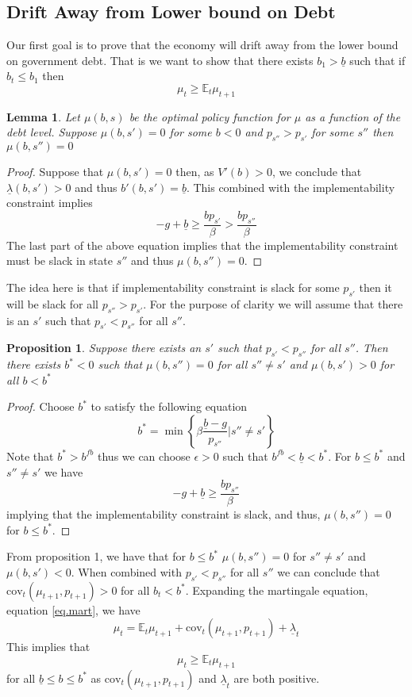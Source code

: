 \documentclass[12pt]{article}
\newcommand{\EE}{\mathbb E}
\newcommand{\cov}{\text{cov}}
\newtheorem{lemma}{Lemma}
\newtheorem{proposition}{Proposition}
\begin{document}
\subsection{Drift Away from Lower bound on Debt}
Our first goal is to prove that the economy will drift away from the lower bound on government debt.  That is we want to show that there exists $b_1 > \underline b$  such that if $b_t\leq b_1$ then 
\[
\mu_t \geq \EE_t \mu_{t+1}
\]
\begin{lemma}
Let $\mu(b,s)$ be the optimal policy function for $\mu$ as a function of the debt level.  Suppose $\mu(b,s') = 0$ for some $b < 0$ and $p_{s''}  > p_{s'}$ for some $s''$ then $\mu(b,s'') = 0$
\end{lemma}
\begin{proof}
Suppose that $\mu(b,s') = 0$ then, as $V'(b) > 0$, we conclude that $\underline \lambda(b,s') >0$ and thus $b'(b,s') = \underline b$.  This combined with the implementability constraint implies
\[
	-g +\underline b \geq \frac{b p_{s'}}{\beta} > \frac{b p_{s''}}{\beta}
\]The last part of the above equation implies that the implementability constraint must be slack in state $s''$ and thus $\mu(b,s'') = 0$.
\end{proof}  The idea here is that if implementability constraint is slack for some $p_{s'}$ then it will be slack for all $p_{s''} > p_{s'}$.  For the purpose of clarity we will assume that there is an $s'$ such that $p_{s'} < p_{s''}$ for all $s''$.
\begin{proposition}  Suppose there exists an $s'$ such that $p_{s'} < p_{s''}$ for all $s''$.  Then there exists $b^* < 0$ such that $\mu(b,s'') = 0$ for all $s'' \neq s'$ and $\mu(b, s') >0$ for all $b  < b^*$ 
\end{proposition}
\begin{proof}  Choose $b^*$ to satisfy the following equation
\[
	b^* = \min\left\{\beta\frac{\underline b-g}{p_{s''}}\biggl|s'' \neq s'\right\}
\] Note that $b^* > b^{fb}$  thus we can choose $\epsilon >0$ such that $b^{fb} < \underline b < b^*$.  For $b \leq b^*$ and $s''\neq s'$ we have
\[
	-g + \underline b \geq \frac{b p_{s''}}{\beta}
\] implying that the implementability constraint is slack, and thus, $\mu(b,s'') = 0$ for $b \leq b^*$.
\end{proof}  From proposition 1, we have that for $b \leq b^*$ $\mu(b,s'') = 0$ for $s'' \neq s'$ and $\mu(b,s') < 0$.  When combined with $p_{s'} < p_{s''}$ for all $s''$ we can conclude that $\cov_t(\mu_{t+1},p_{t+1}) > 0$ for all $b_t < b^*$.  Expanding the martingale equation, equation \eqref{eq.mart}, we have
\[
	\mu_t = \EE_t\mu_{t+1} +\cov_t(\mu_{t+1},p_{t+1}) +\underline \lambda_t
\]This implies that 
\[
	\mu_t \geq \EE_t\mu_{t+1}
\]for all $\underline b\leq b\leq b^*$ as $\cov_t(\mu_{t+1},p_{t+1})$ and $\underline \lambda_t$ are both positive. 
\end{document}
